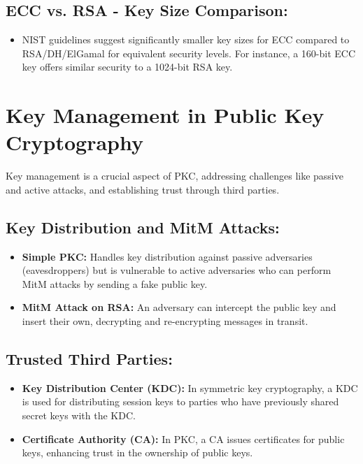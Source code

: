 \documentclass[12pt]{article}
\begin{document}
\subsection*{ECC vs. RSA - Key Size Comparison:}
\begin{itemize}
    \item NIST guidelines suggest significantly smaller key sizes for ECC compared to RSA/DH/ElGamal for equivalent security levels. For instance, a 160-bit ECC key offers similar security to a 1024-bit RSA key.
\end{itemize}


\section*{Key Management in Public Key Cryptography}

Key management is a crucial aspect of PKC, addressing challenges like passive and active attacks, and establishing trust through third parties.

\subsection*{Key Distribution and MitM Attacks:}
\begin{itemize}
    \item \textbf{Simple PKC:} Handles key distribution against passive adversaries (eavesdroppers) but is vulnerable to active adversaries who can perform MitM attacks by sending a fake public key.
    \item \textbf{MitM Attack on RSA:} An adversary can intercept the public key and insert their own, decrypting and re-encrypting messages in transit.
\end{itemize}

\subsection*{Trusted Third Parties:}
\begin{itemize}
    \item \textbf{Key Distribution Center (KDC):} In symmetric key cryptography, a KDC is used for distributing session keys to parties who have previously shared secret keys with the KDC.
    \item \textbf{Certificate Authority (CA):} In PKC, a CA issues certificates for public keys, enhancing trust in the ownership of public keys.
\end{itemize}
\end{document}
